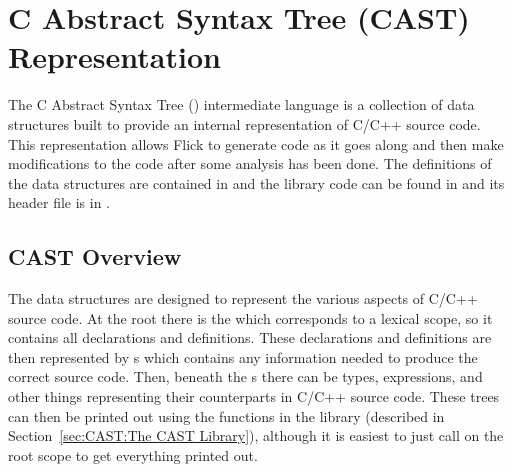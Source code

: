 

\chapter{C Abstract Syntax Tree (CAST) Representation}
\label{cha:CAST}

The C Abstract Syntax Tree (\CAST{}) intermediate language is a collection of
data structures built to provide an internal representation of C/C++ source
code.  This representation allows Flick to generate code as it goes along
and then make modifications to the code after some analysis has been done.  The
definitions of the \CAST{} data structures are contained in
 and the library code can be found in 
and its header file is in .



\section{CAST Overview}
\label{sec:CAST:CAST Overview}

The \CAST{} data structures are designed to represent the various aspects of
C/C++ source code.  At the root there is the  which
corresponds to a lexical scope, so it contains all declarations and
definitions.  These declarations and definitions are then represented by
s which contains any information needed to produce the correct
source code.  Then, beneath the s there can be types,
expressions, and other things representing their counterparts in C/C++ source
code.  These \CAST{} trees can then be printed out using the
 functions in the \CAST{} library (described in
Section~\ref{sec:CAST:The CAST Library}), although it is easiest to just call
 on the root scope to get everything printed out.

